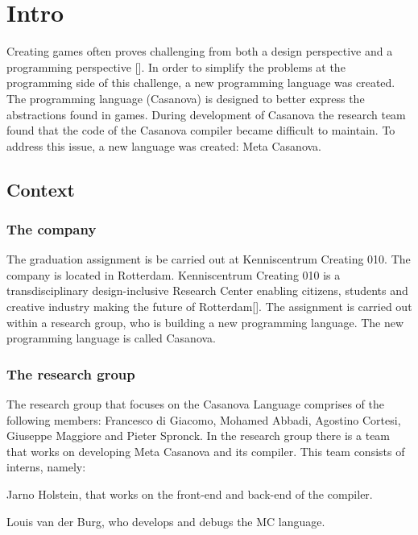\section{Intro}

Creating games often proves challenging from both a design perspective and a programming perspective []. 
In order to simplify the problems at the programming side of this challenge, a new programming language was created. 
The programming language (Casanova) is designed to better express the abstractions found in games. 
During development of Casanova the research team found that the code of the Casanova compiler became difficult to maintain. 
To address this issue, a new language was created: Meta Casanova.

\subsection{Context}

\subsubsection {The company}

The graduation assignment is be carried out at Kenniscentrum Creating 010. 
The company is located in Rotterdam. Kenniscentrum Creating 010 is a transdisciplinary design-inclusive Research Center enabling citizens, 
students and creative industry making the future of Rotterdam[].
\linebreak
The assignment is carried out within a research group, who is building a new programming language. 
The new programming language is called Casanova.

\subsubsection {The research group}

The research group that focuses on the Casanova Language comprises of the following members: 
Francesco di Giacomo, Mohamed Abbadi, Agostino Cortesi, Giuseppe Maggiore and Pieter Spronck.
\linebreak
In the research group there is a team that works on developing Meta Casanova and its compiler. This team consists of interns, namely:

Jarno Holstein, that works on the front-end and back-end of the compiler.

Louis van der Burg, who develops and debugs the MC language.

